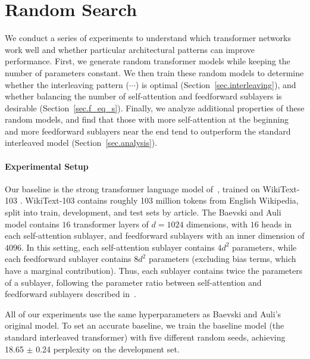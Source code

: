 \documentclass[11pt,a4paper]{article}
\begin{document}
\section{Random Search} \label{sec.exploration}

We conduct a series of experiments to understand which transformer networks work well and whether particular architectural patterns can  improve performance.
First, we generate random transformer models while keeping the number of parameters constant.
We then train these random models to determine whether the interleaving pattern ({\Large \texttt{}}\thinspace$\cdots$) is optimal (Section~\ref{sec.interleaving}), and whether balancing the number of self-attention and feedforward sublayers is desirable (Section~\ref{sec.f_eq_s}).
Finally, we analyze additional properties of these random models, and find that those with more self-attention at the beginning and more feedforward sublayers near the end tend to outperform the standard interleaved model (Section~\ref{sec.analysis}).



\paragraph{Experimental Setup}
Our baseline is the strong transformer language model of~\citet{baevski2018adaptive}, trained on WikiText-103 \citep{merity2016pointer}. WikiText-103 contains roughly 103 million tokens from English Wikipedia, split into train, development, and test sets by article.  The Baevski and Auli model contains $16$ transformer layers of $d=1024$ dimensions, with $16$ heads in each self-attention sublayer, and feedforward sublayers with an inner dimension of $4096$.
In this setting, each self-attention sublayer contains $4d^2$ parameters, while each feedforward sublayer contains $8d^2$ parameters (excluding bias terms, which have a marginal contribution).
Thus, each {\Large \texttt{}} sublayer contains twice the parameters of a {\Large \texttt{}} sublayer, following the parameter ratio between self-attention and feedforward sublayers described in~\citet{AIAYN}.

All of our experiments use the same hyperparameters as Baevski and Auli's original model.
To set an accurate baseline, we train the baseline model (the standard interleaved transformer) with five different random seeds, achieving 18.65 $\pm$ 0.24 perplexity on the development set. 
\end{document}
